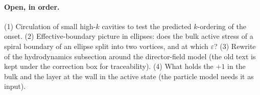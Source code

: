 \paragraph{Open, in order.} (1) Circulation of small high-$k$ cavities to
test the predicted $k$-ordering of the onset. (2) Effective-boundary picture in ellipses: does the bulk active stress of a spiral boundary of an ellipse split
into two vortices, and at which $\varepsilon$? (3) Rewrite of the hydrodynamics subsection around the director-field model (the old text is kept under the
correction box for traceability). (4) What holds the $+1$ in the bulk and the layer at the wall in the active state (the particle model needs it as input). 
